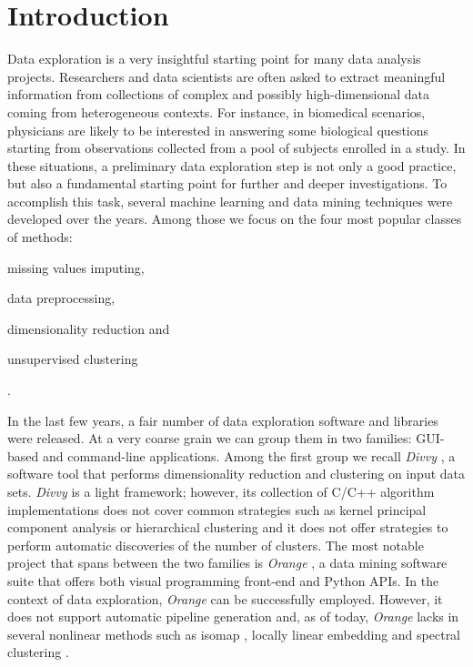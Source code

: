 \documentclass[twoside,11pt]{article}
\makeatletter
\newcommand{\py}{{Python}\@\xspace}
\makeatother
\begin{document}
\section{Introduction}\label{sec:intro}
Data exploration is a very insightful starting point for many data analysis projects. Researchers and data scientists are often asked to extract meaningful information from collections of complex and possibly high-dimensional data coming from heterogeneous contexts.
For instance, in biomedical scenarios, physicians are likely to be interested in answering some biological questions starting from observations collected from a pool of subjects enrolled in a study.
In these situations, a preliminary data exploration step is not only a good practice, but also a fundamental starting point for further and deeper investigations.
To accomplish this task, several machine learning and data mining techniques were developed over the years.
Among those we focus on the four most popular classes of methods: \begin{enumerate*}[label=(\roman*)]
  \item missing values imputing,
  \item data preprocessing,
  \item dimensionality reduction and
  \item unsupervised clustering
\end{enumerate*}.

In the last few years, a fair number of data exploration software and libraries were released. At a very coarse grain we can group them in two families: GUI-based and command-line applications.
Among the first group we recall \emph{Divvy} \citep{lewis2013divvy}, a software tool that performs dimensionality reduction and clustering on input data sets. \emph{Divvy} is a light framework; however,
its collection of {C/C++} algorithm implementations does not cover common strategies such as kernel principal component analysis \citep{scholkopf1997kernel} or hierarchical clustering \citep{friedman2001elements} and it does not offer strategies to perform automatic discoveries of the number of clusters.
The most notable project that spans between the two families is \emph{Orange} \citep{demvsar2013orange}, a data mining software suite that offers both visual programming front-end and \py APIs. In the context of data exploration, \emph{Orange} can be successfully employed. However, it does not support automatic pipeline generation
and, as of today, \emph{Orange} lacks in several nonlinear methods such as isomap \citep{tenenbaum2000global}, locally linear embedding \citep{roweis2000nonlinear} and spectral clustering \citep{shi2000normalized}.
\end{document}

